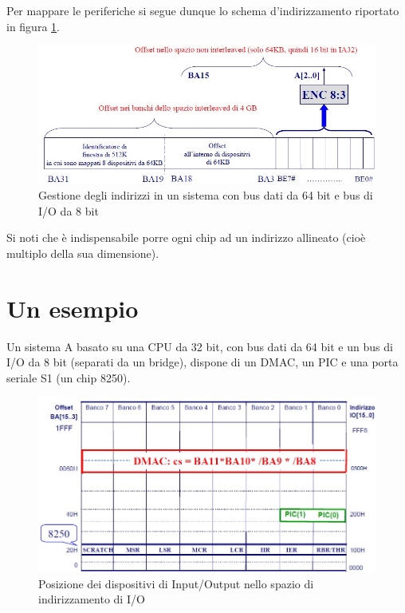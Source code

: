 Per mappare le periferiche si segue dunque lo schema d'indirizzamento riportato in figura \ref{fig:perifericheBanchi}.

\begin{figure}[!h]
\centering
\includegraphics[width=0.85\columnwidth]{img/perifericheBanchi}
\caption{Gestione degli indirizzi in un sistema con bus dati da 64 bit e bus di I/O da 8 bit}
\label{fig:perifericheBanchi}
\end{figure} 

Si noti che è indispensabile porre ogni chip ad un indirizzo allineato (cioè multiplo della sua dimensione).

\section{Un esempio}
\label{sec:esempio}

Un sistema A basato su una CPU da 32 bit, con bus dati da 64 bit e un bus di I/O da 8 bit (separati
da un bridge), dispone di un DMAC, un PIC e una porta seriale S1 (un chip 8250).

\begin{figure}[!h]
\centering
\includegraphics[width=0.95\columnwidth]{img/esempioPerifericheMappate}
\caption{Posizione dei dispositivi di Input/Output nello spazio di indirizzamento di I/O}
\label{fig:esempioPerifericheMappate}
\end{figure}

